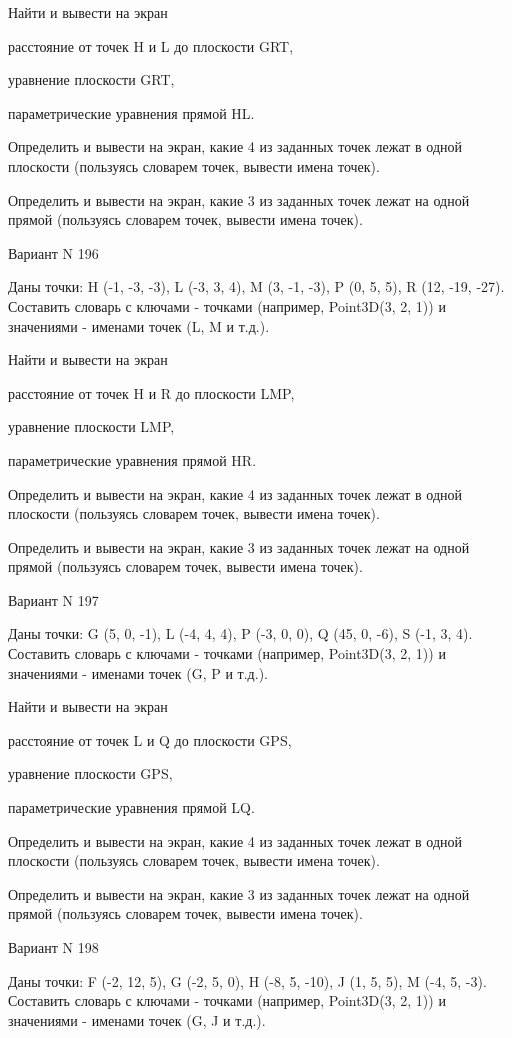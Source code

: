 \documentclass[11pt]{report}
\begin{document}
Найти и вывести на экран


расстояние от точек H и L до плоскости GRT,


уравнение плоскости GRT,


параметрические уравнения прямой HL.


Определить и вывести на экран, какие 4 из заданных точек лежат в одной плоскости (пользуясь словарем точек, вывести имена точек).


Определить и вывести на экран, какие 3 из заданных точек лежат на одной прямой (пользуясь словарем точек, вывести имена точек).

\newpage
Вариант N 196

Даны точки: H (-1, -3, -3), L (-3, 3, 4), M (3, -1, -3), P (0, 5, 5), R (12, -19, -27).
Составить словарь с ключами - точками (например, Point3D(3, 2, 1)) и значениями - именами точек (L, M и т.д.).


Найти и вывести на экран


расстояние от точек H и R до плоскости LMP,


уравнение плоскости LMP,


параметрические уравнения прямой HR.


Определить и вывести на экран, какие 4 из заданных точек лежат в одной плоскости (пользуясь словарем точек, вывести имена точек).


Определить и вывести на экран, какие 3 из заданных точек лежат на одной прямой (пользуясь словарем точек, вывести имена точек).

\newpage
Вариант N 197

Даны точки: G (5, 0, -1), L (-4, 4, 4), P (-3, 0, 0), Q (45, 0, -6), S (-1, 3, 4).
Составить словарь с ключами - точками (например, Point3D(3, 2, 1)) и значениями - именами точек (G, P и т.д.).


Найти и вывести на экран


расстояние от точек L и Q до плоскости GPS,


уравнение плоскости GPS,


параметрические уравнения прямой LQ.


Определить и вывести на экран, какие 4 из заданных точек лежат в одной плоскости (пользуясь словарем точек, вывести имена точек).


Определить и вывести на экран, какие 3 из заданных точек лежат на одной прямой (пользуясь словарем точек, вывести имена точек).

\newpage
Вариант N 198

Даны точки: F (-2, 12, 5), G (-2, 5, 0), H (-8, 5, -10), J (1, 5, 5), M (-4, 5, -3).
Составить словарь с ключами - точками (например, Point3D(3, 2, 1)) и значениями - именами точек (G, J и т.д.).
\end{document}
